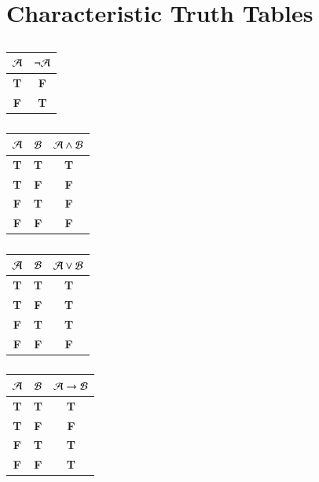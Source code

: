 \documentclass[12pt, a4paper, oneside, openright, titlepage]{book}
\begin{document}
\section{\textsection Characteristic Truth Tables}


\begin{table}[H]
    \centering
    \caption{}
    \begin{tabular}{c|c}
        $\mathcal{A}$ & $\lnot \mathcal{A}$ \\ \hline
        \textbf{T} & \textbf{F} \\
        \textbf{F} & \textbf{T}
    \end{tabular}
\end{table}


\begin{table}[H]
    \centering
    \caption{}
    \begin{tabular}{cc|c}
        $\mathcal{A}$ & $\mathcal{B}$ & $\mathcal{A} \wedge \mathcal{B}$\\ \hline
        \textbf{T} & \textbf{T} & \textbf{T} \\
        \textbf{T} & \textbf{F} & \textbf{F} \\
        \textbf{F} & \textbf{T} & \textbf{F} \\
        \textbf{F} & \textbf{F} & \textbf{F}
    \end{tabular}
\end{table}


\begin{table}[H]
    \centering
    \caption{}
    \begin{tabular}{cc|c}
        $\mathcal{A}$ & $\mathcal{B}$ & $\mathcal{A}\lor \mathcal{B}$ \\ \hline
        \textbf{T} & \textbf{T} & \textbf{T} \\
        \textbf{T} & \textbf{F} & \textbf{T} \\
        \textbf{F} & \textbf{T} & \textbf{T} \\
        \textbf{F} & \textbf{F} & \textbf{F}
    \end{tabular}
\end{table}


\begin{table}[H]
    \centering
    \caption{}
    \begin{tabular}{cc|c}
        $\mathcal{A}$ & $\mathcal{B}$ & $\mathcal{A} \rightarrow \mathcal{B}$ \\ \hline
        \textbf{T} & \textbf{T} & \textbf{T} \\
        \textbf{T} & \textbf{F} & \textbf{F} \\
        \textbf{F} & \textbf{T} & \textbf{T} \\
        \textbf{F} & \textbf{F} & \textbf{T}
    \end{tabular}
\end{table}
\end{document}

